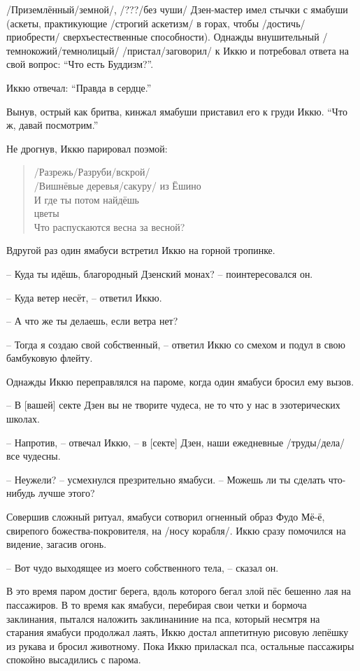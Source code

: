 \begin{ver}
/Приземлённый/земной/, /???/без чуши/ Дзен-мастер
имел стычки с ямабуши (аскеты, практикующие /строгий аскетизм/ в
горах, чтобы /достичь/приобрести/ сверхъестественные способности). 
Однажды внушительный /темнокожий/темнолицый/
/пристал/заговорил/ к Иккю и потребовал ответа на свой
вопрос: ``Что есть Буддизм?''.

Иккю отвечал: ``Правда в сердце.''  

Вынув, острый как бритва, кинжал ямабуши приставил его к груди
Иккю. ``Что ж, давай посмотрим.''

Не дрогнув, Иккю парировал поэмой: 
\end{ver}

\begin{ver}
  \begin{verse}
  /Разрежь/Разруби/вскрой/\\
  /Вишнёвые деревья/сакуру/ из Ёшино\\
  И где ты потом найдёшь\\
  [Те] цветы\\
  Что распускаются весна за весной?
  \end{verse}
\end{ver}

\begin{ver}
  Вдругой раз один ямабуси встретил Иккю на горной тропинке.
  
  -- Куда ты идёшь, благородный Дзенский монах? -- поинтересовался он.
  
  -- Куда ветер несёт, -- ответил Иккю.

  -- А что же ты делаешь, если ветра нет?

  -- Тогда я создаю свой собственный, -- ответил Иккю со смехом и
  подул в свою бамбуковую флейту.
\end{ver}

\begin{ver}
  Однажды Иккю переправлялся на пароме, когда один ямабуси бросил ему
  вызов.

  -- В [вашей] секте Дзен вы не творите чудеса, не то что у нас в
  эзотерических школах.

  -- Напротив, -- отвечал Иккю, -- в [секте] Дзен, наши ежедневные
  /труды/дела/ все чудесны. 

  -- Неужели? -- усмехнулся презрительно ямабуси. -- Можешь ли ты
  сделать что-нибудь лучше этого?

  Совершив сложный ритуал, ямабуси сотворил огненный образ Фудо Мё-ё,
  свирепого божества-покровителя, на /носу корабля/.
  Иккю сразу помочился на видение, загасив огонь.

  -- Вот чудо выходящее из моего собственного тела, -- сказал он.

  В это время паром достиг берега, вдоль которого бегал злой пёс
  бешенно лая на пассажиров. В то время как ямабуси, перебирая свои
  четки и бормоча заклинания, пытался наложить заклинаниние на пса,
  который несмтря на старания ямабуси продолжал лаять, Иккю достал
  аппетитную рисовую лепёшку из рукава и бросил животному. Пока Иккю
  приласкал пса, остальные пассажиры спокойно высадились с парома.
\end{ver}
